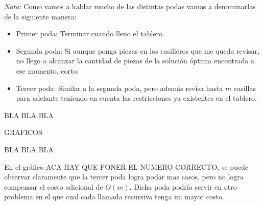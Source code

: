 \emph{Nota:} Como vamos a hablar mucho de las distintas podas vamos a denominarlas de la siguiente manera:
\begin{itemize}
\item Primer poda: Terminar cuando lleno el tablero.
\item Segunda poda: Si aunque ponga piezas en los casilleros que me queda revisar, no llego a alcanzar la cantidad de piezas de la solución óptima encontrada a ese momento, corto.
\item Tercer poda: Similar a la segunda poda, pero además revisa hasta $m$ casillas para adelante teniendo en cuenta las restricciones ya existentes en el tablero.
\end{itemize}

BLA BLA BLA

GRAFICOS

BLA BLA BLA

En el gráfico ACA HAY QUE PONER EL NUMERO CORRECTO, se puede observar claramente que la tercer poda logra podar mas casos, pero no logra compensar el costo adicional de $O(m)$. Dicha poda podría servir en otro problema en el que cual cada llamada recursiva tenga un mayor costo.